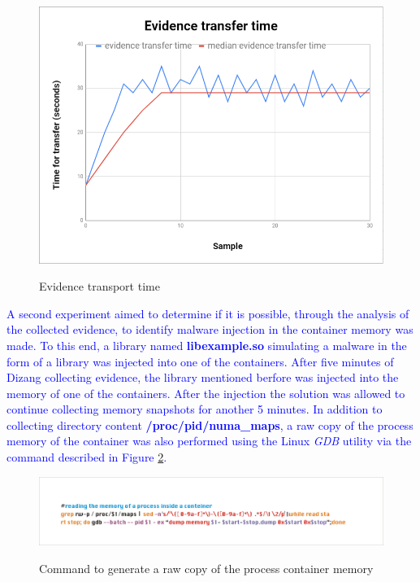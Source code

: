 \documentclass[conference]{IEEEtran}
\newcommand{\fancyname}{Dizang }
\begin{document}
\begin{figure}[htb!]
\footnotesize
\caption{Evidence transport time}
\includegraphics[scale=0.43]{evidencia_download_ieee.png}
\centering
\label{fig:evidencia_transporte}
\end{figure}


\textcolor{blue}{A second experiment aimed to determine if it is possible, through the analysis of the collected evidence, to identify malware injection in the container memory was made.
%
To this end, a library named \textbf{libexample.so} simulating a malware in the form of a library was injected into one of the containers.
%
After five minutes of \fancyname collecting evidence, the library mentioned berfore was injected into the memory of one of the containers. 
%
After the injection the solution was allowed to continue collecting memory snapshots for another 5 minutes.
%
In addition to collecting directory content \textbf{/proc/pid/numa\_maps}, a raw copy of the process memory of the container was also performed using the Linux \textit{GDB} utility via the command described in Figure \ref{fig:comando-copia}.}

\begin{figure}[htb!]
\footnotesize
\caption{Command to generate a raw copy of the process container memory}
\includegraphics[scale=0.40]{comando-copia-memoria-gdb.jpg}
\centering
\label{fig:comando-copia}
\end{figure}
\end{document}
